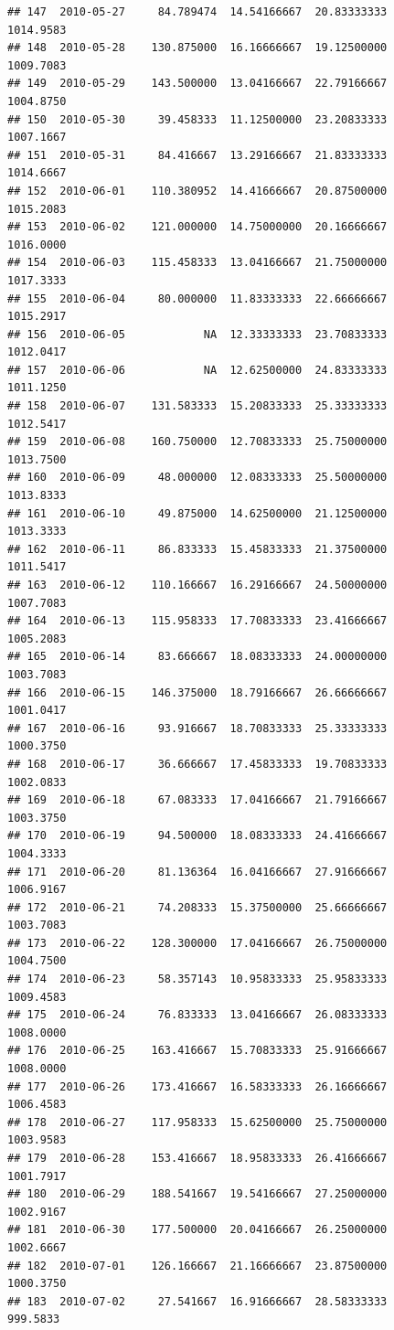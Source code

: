 \documentclass[
]{article}
\begin{document}
\begin{verbatim}
## 147  2010-05-27     84.789474  14.54166667  20.83333333    1014.9583
## 148  2010-05-28    130.875000  16.16666667  19.12500000    1009.7083
## 149  2010-05-29    143.500000  13.04166667  22.79166667    1004.8750
## 150  2010-05-30     39.458333  11.12500000  23.20833333    1007.1667
## 151  2010-05-31     84.416667  13.29166667  21.83333333    1014.6667
## 152  2010-06-01    110.380952  14.41666667  20.87500000    1015.2083
## 153  2010-06-02    121.000000  14.75000000  20.16666667    1016.0000
## 154  2010-06-03    115.458333  13.04166667  21.75000000    1017.3333
## 155  2010-06-04     80.000000  11.83333333  22.66666667    1015.2917
## 156  2010-06-05            NA  12.33333333  23.70833333    1012.0417
## 157  2010-06-06            NA  12.62500000  24.83333333    1011.1250
## 158  2010-06-07    131.583333  15.20833333  25.33333333    1012.5417
## 159  2010-06-08    160.750000  12.70833333  25.75000000    1013.7500
## 160  2010-06-09     48.000000  12.08333333  25.50000000    1013.8333
## 161  2010-06-10     49.875000  14.62500000  21.12500000    1013.3333
## 162  2010-06-11     86.833333  15.45833333  21.37500000    1011.5417
## 163  2010-06-12    110.166667  16.29166667  24.50000000    1007.7083
## 164  2010-06-13    115.958333  17.70833333  23.41666667    1005.2083
## 165  2010-06-14     83.666667  18.08333333  24.00000000    1003.7083
## 166  2010-06-15    146.375000  18.79166667  26.66666667    1001.0417
## 167  2010-06-16     93.916667  18.70833333  25.33333333    1000.3750
## 168  2010-06-17     36.666667  17.45833333  19.70833333    1002.0833
## 169  2010-06-18     67.083333  17.04166667  21.79166667    1003.3750
## 170  2010-06-19     94.500000  18.08333333  24.41666667    1004.3333
## 171  2010-06-20     81.136364  16.04166667  27.91666667    1006.9167
## 172  2010-06-21     74.208333  15.37500000  25.66666667    1003.7083
## 173  2010-06-22    128.300000  17.04166667  26.75000000    1004.7500
## 174  2010-06-23     58.357143  10.95833333  25.95833333    1009.4583
## 175  2010-06-24     76.833333  13.04166667  26.08333333    1008.0000
## 176  2010-06-25    163.416667  15.70833333  25.91666667    1008.0000
## 177  2010-06-26    173.416667  16.58333333  26.16666667    1006.4583
## 178  2010-06-27    117.958333  15.62500000  25.75000000    1003.9583
## 179  2010-06-28    153.416667  18.95833333  26.41666667    1001.7917
## 180  2010-06-29    188.541667  19.54166667  27.25000000    1002.9167
## 181  2010-06-30    177.500000  20.04166667  26.25000000    1002.6667
## 182  2010-07-01    126.166667  21.16666667  23.87500000    1000.3750
## 183  2010-07-02     27.541667  16.91666667  28.58333333     999.5833

\end{verbatim}
\end{document}
